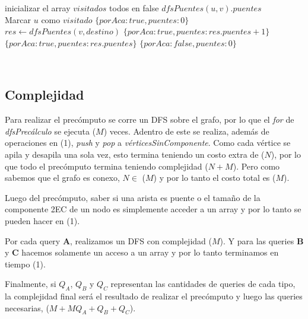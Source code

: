 \begin{algorithmic}

    \State inicializar el array $visitados$ todos en false
    \State \Return $dfsPuentes(u,v).puentes$
\EndFunction
\\

    \State Marcar $u$ como $visitado$
        \State \Return $\{porAca: true, puentes: 0\}$
    \EndIf
        \State $res \gets dfsPuentes(v, destino)$
                \State \Return $\{porAca: true, puentes: res.puentes + 1\}$
            \Else
                \State \Return $\{porAca: true, puentes: res.puentes\}$
            \EndIf
        \EndIf
    \EndFor
    \State \Return $\{porAca: false, puentes: 0\}$
\EndFunction
\\

\end{algorithmic}

\begin{algorithmic}

    \State {}
\EndFunction
\\

\end{algorithmic}

\begin{algorithmic}

    \State {}
\EndFunction

\end{algorithmic}

\subsection{Complejidad}

Para realizar el precómputo se corre un DFS sobre el grafo, por lo que el \textit{for} de \textit{dfsPrecálculo} se ejecuta \bigo($M$) veces. Adentro de este se realiza, además de operaciones en \bigo(1), \textit{push} y \textit{pop} a \textit{vérticesSinComponente}. Como cada vértice se apila y desapila una sola vez, esto termina teniendo un costo extra de \bigo($N$), por lo que todo el precómputo termina teniendo complejidad \bigo($N+M$). Pero como sabemos que el grafo es conexo, $N \in$ \bigo($M$) y por lo tanto el costo total es \bigo($M$).

Luego del precómputo, saber si una arista es puente o el tamaño de la componente 2EC de un nodo es simplemente acceder a un array y por lo tanto se pueden hacer en \bigo(1).

Por cada query \textbf{A}, realizamos un DFS con complejidad \bigo($M$). Y para las queries \textbf{B} y \textbf{C} hacemos solamente un acceso a un array y por lo tanto terminamos en tiempo \bigo(1).

Finalmente, si $Q_A$, $Q_B$ y $Q_C$ representan las cantidades de queries de cada tipo, la complejidad final será el resultado de realizar el precómputo y luego las queries necesarias, \bigo($M + M Q_A + Q_B + Q_C$).
